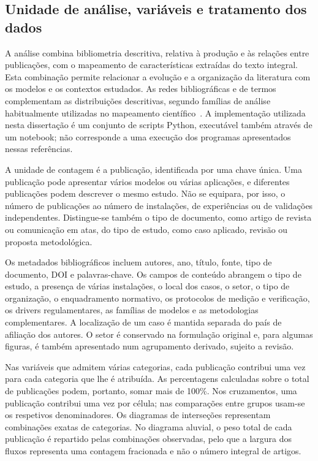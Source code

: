 \subsection{Unidade de análise, variáveis e tratamento dos dados}

A análise combina bibliometria descritiva, relativa à produção e às
relações entre publicações, com o mapeamento de características extraídas
do texto integral. Esta combinação permite relacionar a evolução e a
organização da literatura com os modelos e os contextos estudados.
As redes bibliográficas e de termos complementam as distribuições
descritivas, segundo famílias de análise habitualmente utilizadas no
mapeamento científico~\cite{Aria2017Bibliometrix,VanEck2010VOSviewer}.
A implementação utilizada nesta dissertação é um conjunto de scripts
Python, executável também através de um notebook; não corresponde a
uma execução dos programas apresentados nessas referências.

A unidade de contagem é a publicação, identificada por uma chave única.
Uma publicação pode apresentar vários modelos ou várias aplicações,
e diferentes publicações podem descrever o mesmo estudo. Não se
equipara, por isso, o número de publicações ao número de instalações,
de experiências ou de validações independentes. Distingue-se também
o tipo de documento, como artigo de revista ou comunicação em atas,
do tipo de estudo, como caso aplicado, revisão ou proposta metodológica.

Os metadados bibliográficos incluem autores, ano, título, fonte,
tipo de documento, DOI e palavras-chave. Os campos de conteúdo
abrangem o tipo de estudo, a presença de várias instalações, o local
dos casos, o setor, o tipo de organização, o enquadramento normativo,
os protocolos de medição e verificação, os drivers regulamentares,
as famílias de modelos e as metodologias complementares. A localização
de um caso é mantida separada do país de afiliação dos autores.
O setor é conservado na formulação original e, para algumas figuras,
é também apresentado num agrupamento derivado, sujeito a revisão.

Nas variáveis que admitem várias categorias, cada publicação contribui
uma vez para cada categoria que lhe é atribuída. As percentagens
calculadas sobre o total de publicações podem, portanto, somar mais
de 100\%. Nos cruzamentos, uma publicação contribui uma vez por célula;
nas comparações entre grupos usam-se os respetivos denominadores.
Os diagramas de interseções representam combinações exatas de categorias.
No diagrama aluvial, o peso total de cada publicação é repartido pelas
combinações observadas, pelo que a largura dos fluxos representa uma
contagem fracionada e não o número integral de artigos.

